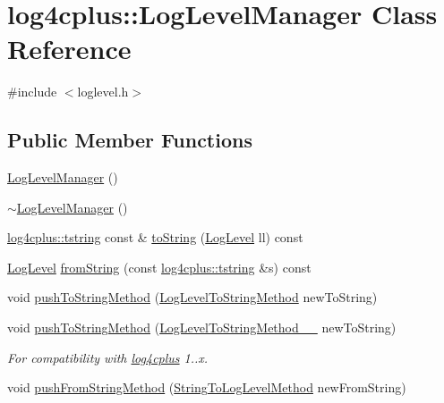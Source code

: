 \hypertarget{classlog4cplus_1_1LogLevelManager}{\section{log4cplus\-:\-:Log\-Level\-Manager Class Reference}
\label{classlog4cplus_1_1LogLevelManager}
}


{\ttfamily \#include $<$loglevel.\-h$>$}

\subsection*{Public Member Functions}
\begin{DoxyCompactItemize}
\item 
\hyperlink{classlog4cplus_1_1LogLevelManager_ab5157911b826ef79d3567a815f2cf905}{Log\-Level\-Manager} ()
\item 
\hyperlink{classlog4cplus_1_1LogLevelManager_aadaa13741733060765a14ad931f75aae}{$\sim$\-Log\-Level\-Manager} ()
\item 
\hyperlink{namespacelog4cplus_a3c9287f6ebcddc50355e29d71152117b}{log4cplus\-::tstring} const \& \hyperlink{classlog4cplus_1_1LogLevelManager_a75c7c090bb3dfaa54be494664788954c}{to\-String} (\hyperlink{namespacelog4cplus_abd332cc8c98fefcbbdcf57b6b3867de9}{Log\-Level} ll) const 
\item 
\hyperlink{namespacelog4cplus_abd332cc8c98fefcbbdcf57b6b3867de9}{Log\-Level} \hyperlink{classlog4cplus_1_1LogLevelManager_a7bd4b3b5ef7dcae759860282465187bc}{from\-String} (const \hyperlink{namespacelog4cplus_a3c9287f6ebcddc50355e29d71152117b}{log4cplus\-::tstring} \&s) const 
\item 
void \hyperlink{classlog4cplus_1_1LogLevelManager_a8450fc7607952ab8d222e15440a42eb8}{push\-To\-String\-Method} (\hyperlink{namespacelog4cplus_affe4873120aa349e25a21f2e0925f3d4}{Log\-Level\-To\-String\-Method} new\-To\-String)
\item 
void \hyperlink{classlog4cplus_1_1LogLevelManager_a9d22dee4c11b603479bcae4a7b06642d}{push\-To\-String\-Method} (\hyperlink{namespacelog4cplus_adaf78472c00019b22f0da0d2ccecc3ca}{Log\-Level\-To\-String\-Method\-\_\-\_} new\-To\-String)
\begin{DoxyCompactList}\small\item\em For compatibility with \hyperlink{namespacelog4cplus}{log4cplus} 1..\-x. \end{DoxyCompactList}\item 
void \hyperlink{classlog4cplus_1_1LogLevelManager_a12d23666cee4eb8489cfb3e8119e5890}{push\-From\-String\-Method} (\hyperlink{namespacelog4cplus_a8c44b16c1c39b70a117adea176b77275}{String\-To\-Log\-Level\-Method} new\-From\-String)
\end{DoxyCompactItemize}



